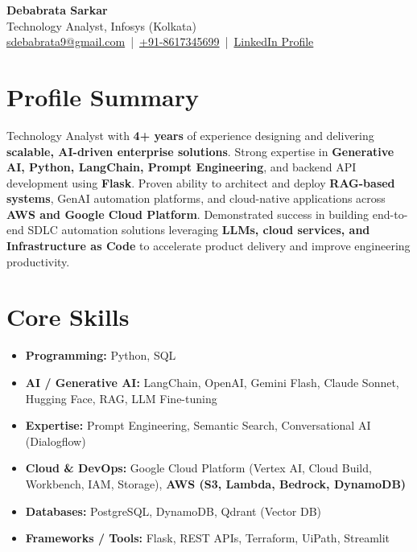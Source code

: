 \documentclass[a4paper,11pt]{article}
\begin{document}
\begin{center}
    {\Huge \bfseries Debabrata Sarkar} \\[12pt]
    Technology Analyst, Infosys (Kolkata) \\[6pt]
    \href{mailto:sdebabrata9@gmail.com}{sdebabrata9@gmail.com} \,|\, 
    \href{tel:+918617345699}{+91-8617345699} \,|\, 
    \href{https://www.linkedin.com/in/debabrata-sarkar-genai/}{LinkedIn Profile}
\end{center}

\vspace{8pt}

\section*{Profile Summary}
Technology Analyst with \textbf{4+ years} of experience designing and delivering \textbf{scalable, AI-driven enterprise solutions}. Strong expertise in \textbf{Generative AI, Python, LangChain, Prompt Engineering}, and backend API development using \textbf{Flask}. Proven ability to architect and deploy \textbf{RAG-based systems}, GenAI automation platforms, and cloud-native applications across \textbf{AWS and Google Cloud Platform}. Demonstrated success in building end-to-end SDLC automation solutions leveraging \textbf{LLMs, cloud services, and Infrastructure as Code} to accelerate product delivery and improve engineering productivity.

\section*{Core Skills}
\begin{itemize}
    \item \textbf{Programming:} Python, SQL
    \item \textbf{AI / Generative AI:} LangChain, OpenAI, Gemini Flash, Claude Sonnet, Hugging Face, RAG, LLM Fine-tuning
    \item \textbf{Expertise:} Prompt Engineering, Semantic Search, Conversational AI (Dialogflow)
    \item \textbf{Cloud \& DevOps:} 
    Google Cloud Platform (Vertex AI, Cloud Build, Workbench, IAM, Storage), 
    \textbf{AWS (S3, Lambda, Bedrock, DynamoDB)}
    \item \textbf{Databases:} PostgreSQL, DynamoDB, Qdrant (Vector DB)
    \item \textbf{Frameworks / Tools:} Flask, REST APIs, Terraform, UiPath, Streamlit
\end{itemize}
\end{document}
